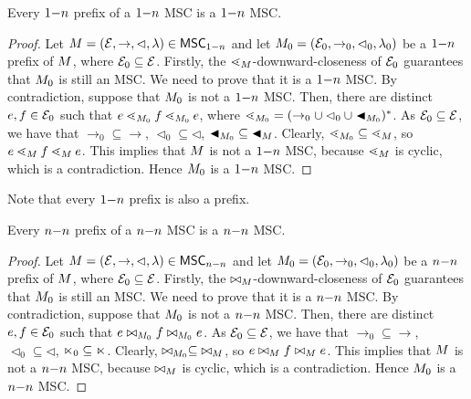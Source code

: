 \documentclass{article}
\begin{document}
\begin{lemma}
	\label{lem:onen-prefix}
	Every $1\mathsf{-}n$ prefix of a $1\mathsf{-}n$ MSC is a $1\mathsf{-}n$ MSC.
\end{lemma}
\begin{proof}
	Let $M = (\mathcal{E}, \to, \lhd, \lambda) \in \mathsf{MSC}_{1\mathsf{-}n}$ and let $M_0 =
	(\mathcal{E}_0, \to_0, \lhd_0, \lambda_0)$ be a $1\mathsf{-}n$ prefix of $M$, where $\mathcal{E}_0 \subseteq \mathcal{E}$. Firstly, the $\lessdot_M$-downward-closeness of $\mathcal{E}_0$ guarantees that ${M_0}$ is still an MSC. We need to prove that it is a $1\mathsf{-}n$ MSC. By contradiction, suppose that $M_0$ is not a $1\mathsf{-}n$ MSC. Then, there are distinct $e,f \in \mathcal{E}_0$ such that $e \lessdot_{M_0} f \lessdot_{M_0} e$, where $\lessdot_{M_0} = (\to_0 \cup \lhd_0 \cup \blacktriangleleft_{M_0})^\ast$. As $\mathcal{E}_0 \subseteq \mathcal{E}$, we have that ${\rightarrow_0} \subseteq {\rightarrow}$, ${\lhd_0} \subseteq {\lhd}$, ${\blacktriangleleft_{M_0}} \subseteq {\blacktriangleleft_M}$. Clearly, $\lessdot_{M_0} \subseteq \lessdot_M$, so $e \lessdot_M f \lessdot_M e$. This implies that $M$ is not a $1\mathsf{-}n$ MSC, because $\lessdot_M$ is cyclic, which is a contradiction. Hence $M_0$ is a $1\mathsf{-}n$ MSC.
\end{proof}

\noindent Note that every $1\mathsf{-}n$ prefix is also a prefix.

\begin{lemma}
	\label{lem:nn-prefix}
	Every $n\mathsf{-}n$ prefix of a $n\mathsf{-}n$ MSC is a $n\mathsf{-}n$ MSC.
\end{lemma}
\begin{proof}
	Let $M = (\mathcal{E}, \to, \lhd, \lambda) \in \mathsf{MSC}_{n\mathsf{-}n}$ and let $M_0 =
	(\mathcal{E}_0, \to_0, \lhd_0, \lambda_0)$ be a $n\mathsf{-}n$ prefix of $M$, where $\mathcal{E}_0 \subseteq \mathcal{E}$. Firstly, the $\bowtie_M$-downward-closeness of $\mathcal{E}_0$ guarantees that ${M_0}$ is still an MSC. We need to prove that it is a $n\mathsf{-}n$ MSC. By contradiction, suppose that $M_0$ is not a $n\mathsf{-}n$ MSC. Then, there are distinct $e,f \in \mathcal{E}_0$ such that $e \bowtie_{M_0} f \bowtie_{M_0} e$. As $\mathcal{E}_0 \subseteq \mathcal{E}$, we have that ${\rightarrow_0} \subseteq {\rightarrow}$, ${\lhd_0} \subseteq {\lhd}$, ${\ltimes_0} \subseteq {\ltimes}$. Clearly, $\bowtie_{M_0} \subseteq\; \bowtie_M$, so $e \bowtie_M f \bowtie_M e$. This implies that $M$ is not a $n\mathsf{-}n$ MSC, because $\bowtie_M$ is cyclic, which is a contradiction. Hence $M_0$ is a $n\mathsf{-}n$ MSC.
\end{proof}
\end{document}
